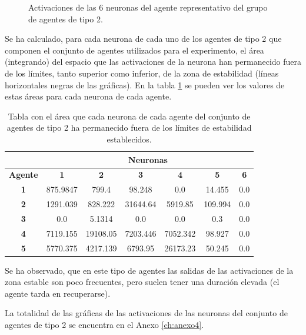 \begin{figure}[H]
  \caption{Activaciones de las 6 neuronas del agente representativo del grupo de agentes de tipo 2.}
  \label{fig:activ2}
\end{figure}

Se ha calculado, para cada neurona de cada uno de los agentes de tipo 2 que componen el conjunto de agentes utilizados para el experimento, el área (integrando) del espacio que las activaciones de la neurona han permanecido fuera de los límites, tanto superior como inferior, de la zona de estabilidad (líneas horizontales negras de las gráficas). En la tabla \ref{table:tActivaciones2} se pueden ver
los valores de estas áreas para cada neurona de cada agente.

\begin{table}[H]
\centering
\begin{tabular}{c|cccccc}
\multicolumn{1}{l|}{}                & \multicolumn{6}{c}{\textbf{Neuronas}}                                       \\ \hline
\multicolumn{1}{l|}{\textbf{Agente}} & \textbf{1} & \textbf{2} & \textbf{3} & \textbf{4} & \textbf{5} & \textbf{6} \\ \hline
\textbf{1}                           & 875.9847   & 799.4      & 98.248     & 0.0        & 14.455     & 0.0        \\
\textbf{2}                           & 1291.039   & 828.222    & 31644.64   & 5919.85    & 109.994    & 0.0        \\
\textbf{3}                           & 0.0        & 5.1314     & 0.0        & 0.0        & 0.3        & 0.0        \\
\textbf{4}                           & 7119.155   & 19108.05   & 7203.446   & 7052.342   & 98.927     & 0.0        \\
\textbf{5}                           & 5770.375   & 4217.139   & 6793.95    & 26173.23   & 50.245     & 0.0
\end{tabular}
\caption{Tabla con el área que cada neurona de cada agente del conjunto de agentes de tipo 2 ha permanecido fuera de los límites de estabilidad establecidos.}
\label{table:tActivaciones2}
\end{table}

Se ha observado, que en este tipo de agentes las salidas de las activaciones de la zona estable son poco frecuentes, pero suelen tener una duración elevada (el agente tarda en recuperarse).

La totalidad de las gráficas de las activaciones de las neuronas del conjunto de agentes de tipo 2 se encuentra en el Anexo \ref{ch:anexo4}.
